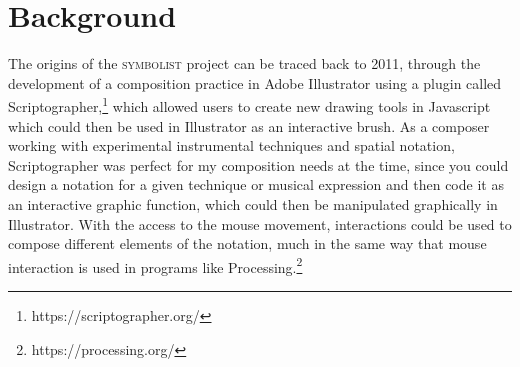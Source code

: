 \documentclass{article}
\title{\papertitle}
\def\symbolist{\textsc{symbolist}\xspace}
\def\drawsocket{\textsc{drawsocket}\xspace}
\begin{document}
%
\capstartfalse
\maketitle
\capstarttrue


\begin{abstract}
  \symbolist is an in-development application for experimental notation, with the goal of creating a working environment for developing symbolic notation for multimedia which can be interpreted and performed by electronics. The program aims to provide an open play space, with tools for experimentation, and thinking visually about relationships between representation and interpretation in media performance. 

The evaluation and re-design of the application based on the need for a bi-directional mapping framework for working with symbolic notation and its corresponding data representations.

In the paper we begin with an overview of the project's background, iterations and relationship to the \drawsocket project, followed by an introduction to the new symbol definition system, and conclude with a perspective on future development directions.

\end{abstract}



\section{Background}\label{sec:background}

The origins of the \symbolist project can be traced back to 2011, through the development of a composition practice in Adobe Illustrator using a plugin called Scriptographer,\footnote{https://scriptographer.org/} which allowed users to create new drawing tools in Javascript which could then be used in Illustrator as an interactive brush. 
As a composer working with experimental instrumental techniques and spatial notation, Scriptographer was perfect for my composition needs at the time, since you could design a notation for a given technique or musical expression and then code it as an interactive graphic function, which could then be manipulated graphically in Illustrator. 
With the access to the mouse movement, interactions could be used to compose different elements of the notation, much in the same way that mouse interaction is used in programs like Processing.\footnote{https://processing.org/}
\end{document}
